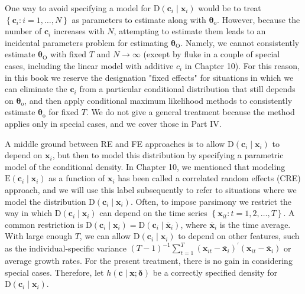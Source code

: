 \documentclass[10pt]{article}
\begin{document}
One way to avoid specifying a model for $\mathrm{D}\left(\mathbf{c}_{i} \mid \mathbf{x}_{i}\right)$ would be to treat $\left\{\mathbf{c}_{i}: i=1, \ldots, N\right\}$ as parameters to estimate along with $\boldsymbol{\theta}_{\mathrm{o}}$. However, because the number of $\mathbf{c}_{i}$ increases with $N$, attempting to estimate them leads to an incidental parameters problem for estimating $\boldsymbol{\theta}_{\mathrm{O}}$. Namely, we cannot consistently estimate $\boldsymbol{\theta}_{\mathrm{O}}$ with fixed $T$ and $N \rightarrow \infty$ (except by fluke in a couple of special cases, including the linear model with additive $c_{i}$ in Chapter 10). For this reason, in this book we reserve the designation "fixed effects" for situations in which we can eliminate the $\mathbf{c}_{i}$ from a particular conditional distribution that still depends on $\boldsymbol{\theta}_{\mathrm{o}}$, and then apply conditional maximum likelihood methods to consistently estimate $\boldsymbol{\theta}_{\mathrm{o}}$ for fixed $T$. We do not give a general treatment because the method applies only in special cases, and we cover those in Part IV.

A middle ground between RE and FE approaches is to allow $\mathrm{D}\left(\mathbf{c}_{i} \mid \mathbf{x}_{i}\right)$ to depend on $\mathbf{x}_{i}$, but then to model this distribution by specifying a parametric model of the conditional density. In Chapter 10, we mentioned that modeling $\mathrm{E}\left(\mathbf{c}_{i} \mid \mathbf{x}_{i}\right)$ as a function of $\mathbf{x}_{i}$ has been called a correlated random effects (CRE) approach, and we will use this label subsequently to refer to situations where we model the distribution $\mathrm{D}\left(\mathbf{c}_{i} \mid \mathbf{x}_{i}\right)$. Often, to impose parsimony we restrict the way in which $\mathrm{D}\left(\mathbf{c}_{i} \mid \mathbf{x}_{i}\right)$ can depend on the time series $\left\{\mathbf{x}_{i t}: t=1,2, \ldots, T\right\}$. A common restriction is $\mathrm{D}\left(\mathbf{c}_{i} \mid \mathbf{x}_{i}\right)=\mathrm{D}\left(\mathbf{c}_{i} \mid \overline{\mathbf{x}}_{i}\right)$, where $\overline{\mathbf{x}}_{i}$ is the time average. With large enough $T$, we can allow $\mathrm{D}\left(\mathbf{c}_{i} \mid \mathbf{x}_{i}\right)$ to depend on other features, such as the individual-specific variance $(T-1)^{-1} \sum_{t=1}^{T}\left(\mathbf{x}_{i t}-\overline{\mathbf{x}}_{i}\right)^{\prime}\left(\mathbf{x}_{i t}-\overline{\mathbf{x}}_{i}\right)$ or average growth rates. For the present treatment, there is no gain in considering special cases. Therefore, let $h(\mathbf{c} \mid \mathbf{x} ; \boldsymbol{\delta})$ be a correctly specified density for $\mathrm{D}\left(\mathbf{c}_{i} \mid \mathbf{x}_{i}\right)$.
\end{document}
